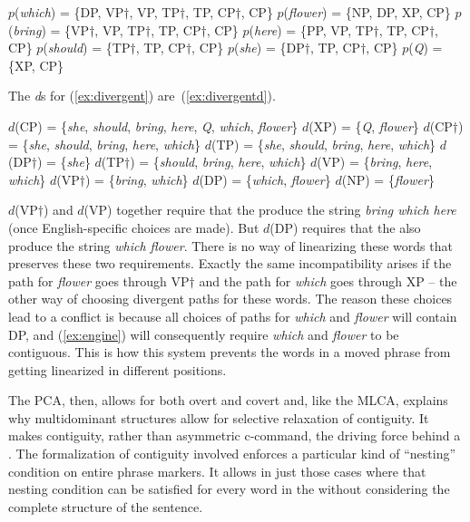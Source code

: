 \documentclass[output=paper]{langsci/langscibook}
\begin{document}
\begin{exe}
	\ex \label{ex:divergent}
	\begin{xlist}
		\ex $p$(\emph{which}) = \{DP, VP$\dag$, VP, TP$\dag$, TP, CP$\dag$, CP\}
		\ex $p$(\emph{flower}) = \{NP, DP, XP, CP\}
		\ex $p$(\emph{bring}) = \{VP$\dag$, VP, TP$\dag$, TP, CP$\dag$, CP\}
		\ex $p$(\emph{here}) = \{PP, VP, TP$\dag$, TP, CP$\dag$, CP\}
		\ex $p$(\emph{should}) = \{TP$\dag$, TP, CP$\dag$, CP\}
		\ex $p$(\emph{she}) = \{DP$\dag$, TP, CP$\dag$, CP\}
		\ex $p$(\emph{Q}) = \{XP, CP\}
	\end{xlist}
\end{exe}
The \emph{d}s for (\ref{ex:divergent}) are~(\ref{ex:divergentd}).
\begin{exe}
	\ex \label{ex:divergentd}
	\begin{xlist}
		\ex $d$(CP) = \{\emph{she}, \emph{should}, \emph{bring}, \emph{here}, \emph{Q}, \emph{which}, \emph{flower}\}
		\ex $d$(XP) = \{\emph{Q}, \emph{flower}\}
		\ex $d$(CP$\dag$) = \{\emph{she}, \emph{should}, \emph{bring}, \emph{here}, \emph{which}\}
		\ex $d$(TP) = \{\emph{she}, \emph{should}, \emph{bring}, \emph{here}, \emph{which}\}
		\ex $d$(DP$\dag$) = \{\emph{she}\}
		\ex $d$(TP$\dag$) = \{\emph{should}, \emph{bring}, \emph{here}, \emph{which}\}
		\ex $d$(VP) = \{\emph{bring}, \emph{here}, \emph{which}\}
		\ex $d$(VP$\dag$) = \{\emph{bring}, \emph{which}\}
		\ex $d$(DP) = \{\emph{which}, \emph{flower}\}
		\ex $d$(NP) = \{\emph{flower}\}
	\end{xlist}
\end{exe}

$d$(VP$\dag$) and $d$(VP) together require that the  produce the
string \emph{bring which here} (once English-specific choices are made). But
$d$(DP) requires that the  also produce the string \emph{which
flower}. There is no way of linearizing these words that preserves these two
requirements. Exactly the same incompatibility arises if the path for
\emph{flower} goes through VP$\dag$ and the path for \emph{which} goes through
XP -- the other way of choosing divergent paths for these words. The reason
these choices lead to a conflict is because all choices of paths for
\emph{which} and \emph{flower} will contain DP, and (\ref{ex:engine}) will
consequently require \emph{which} and \emph{flower} to be contiguous. This is
how this system prevents the words in a moved phrase from getting linearized in
different positions.

The \gls{PCA}, then, allows for both overt and covert  and, like the
\gls{MLCA}, explains why multidominant structures allow for selective
relaxation of contiguity. It makes contiguity, rather than asymmetric
c-command, the driving force behind a . The formalization of
contiguity involved enforces a particular kind of ``nesting'' condition on
entire phrase markers. It allows  in just those cases where that
nesting condition can be satisfied for every word in the  without
considering the complete structure of the sentence.
\end{document}
